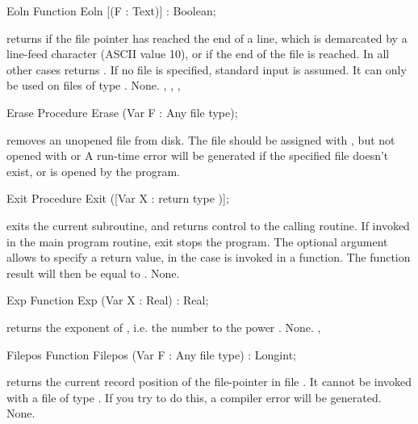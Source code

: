\documentclass{report}
\begin{document}

\begin{function}{Eoln}
\Declaration
Function Eoln [(F : Text)] : Boolean;

\Description
{} returns  if the file pointer has reached the end of a
line, which is demarcated by a line-feed character (ASCII value 10), or if
the end of the file is reached.
In all other cases  returns .
If no file  is specified, standard input is assumed.
It can only be used on files of type .
\Errors
None.
\SeeAlso
{}, , , 
\end{function}


\begin{procedure}{Erase}
\Declaration
Procedure Erase (Var F : Any file type);

\Description
{} removes an unopened file from disk. The file should be
assigned with , but not opened with  or 
\Errors
A run-time error will be generated if the specified file doesn't exist, or
is opened by the program.
\SeeAlso
{}
\end{procedure}


\begin{procedure}{Exit}
\Declaration
Procedure Exit ([Var X : return type )];

\Description
{} exits the current subroutine, and returns control to the calling
routine. If invoked in the main program routine, exit stops the program.
The optional argument  allows to specify a return value, in the case
 is invoked in a function. The function result will then be
equal to .
\Errors
None.
\SeeAlso
{}
\end{procedure}


\begin{function}{Exp}
\Declaration
Function Exp (Var X : Real) : Real;

\Description
{} returns the exponent of , i.e. the number  to the
power .
\Errors
None.
\SeeAlso
{}, 
\end{function}


\begin{function}{Filepos}
\Declaration
Function Filepos (Var F : Any file type) : Longint;

\Description
{} returns the current record position of the file-pointer in file
. It cannot be invoked with a file of type . If you try to
do this, a compiler error will be generated.
\Errors
None.
\SeeAlso
{}
\end{function}
\end{document}
